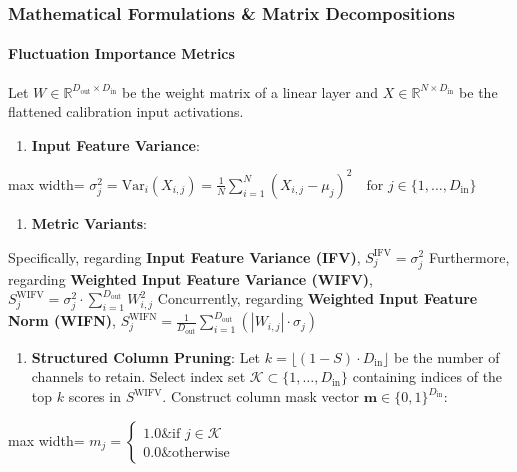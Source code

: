 \subsubsection*{Mathematical Formulations \& Matrix Decompositions}

\paragraph{Fluctuation Importance Metrics}

Let $W \in \mathbb{R}^{D_{\text{out}} \times D_{\text{in}}}$ be the weight matrix of a linear layer and $X \in \mathbb{R}^{N \times D_{\text{in}}}$ be the flattened calibration input activations.

\begin{enumerate}
\item \textbf{Input Feature Variance}:
\end{enumerate}
\begin{center}
\begin{adjustbox}{max width=\columnwidth}
$\displaystyle
\sigma_j^2 = \text{Var}_i(X_{i, j}) = \frac{1}{N} \sum_{i=1}^N \left( X_{i, j} - \mu_j \right)^2 \quad \text{for } j \in \{1, \dots, D_{\text{in}}\}
$
\end{adjustbox}
\end{center}

\begin{enumerate}
\item \textbf{Metric Variants}:
\end{enumerate}
Specifically, regarding \textbf{Input Feature Variance (IFV)}, $\displaystyle S_j^{\text{IFV}} = \sigma_j^2$ Furthermore, regarding \textbf{Weighted Input Feature Variance (WIFV)}, $\displaystyle S_j^{\text{WIFV}} = \sigma_j^2 \cdot \sum_{i=1}^{D_{\text{out}}} W_{i, j}^2$ Concurrently, regarding \textbf{Weighted Input Feature Norm (WIFN)}, $\displaystyle S_j^{\text{WIFN}} = \frac{1}{D_{\text{out}}} \sum_{i=1}^{D_{\text{out}}} \left( |W_{i, j}| \cdot \sigma_j \right)$


\begin{enumerate}
\item \textbf{Structured Column Pruning}:
Let $k = \lfloor (1 - S) \cdot D_{\text{in}} \rfloor$ be the number of channels to retain. Select index set $\mathcal{K} \subset \{1, \dots, D_{\text{in}}\}$ containing indices of the top $k$ scores in $S^{\text{WIFV}}$. Construct column mask vector $\mathbf{m} \in \{0, 1\}^{D_{\text{in}}}$:

\end{enumerate}
\begin{center}
\begin{adjustbox}{max width=\columnwidth}
$\displaystyle
m_j = \begin{cases} 1.0 \& \text{if } j \in \mathcal{K} \\ 0.0 \& \text{otherwise} \end{cases}
$
\end{adjustbox}
\end{center}

